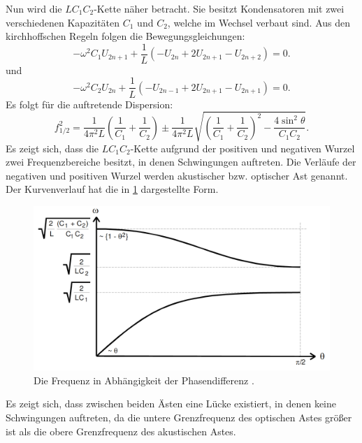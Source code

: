  Nun wird die $LC_1C_2$-Kette näher betracht. Sie besitzt Kondensatoren mit zwei
  verschiedenen Kapazitäten $C_1$ und $C_2$, welche im Wechsel verbaut sind.
 Aus den kirchhoffschen Regeln folgen die Bewegungsgleichungen:
 \begin{equation}
   -\omega^2 C_1 U_{2n+1} + \frac{1}{L} \left( -U_{2n} + 2U_{2n+1} - U_{2n+2} \right) = 0\text{.}
 \end{equation}
 und
 \begin{equation}
   -\omega^2 C_2 U_{2n} + \frac{1}{L} \left( -U_{2n-1} + 2U_{2n+1} - U_{2n+1} \right) = 0\text{.}
 \end{equation}
Es folgt für die auftretende Dispersion:
\begin{equation}
  f_{1/2}^2 = \frac{1}{4\pi^2L}\left(\frac{1}{C_1}+\frac{1}{C_2}\right) \pm \frac{1}{4\pi^2L}\sqrt{\left(\frac{1}{C_1}+\frac{1}{C_2} \right)^2 - \frac{4 \sin^2\theta}{C_1C_2}}\text{.}
\end{equation}
Es zeigt sich, dass die $LC_1C_2$-Kette aufgrund der positiven und negativen Wurzel
zwei Frequenzbereiche besitzt, in denen Schwingungen auftreten. Die Verläufe der
 negativen und positiven Wurzel werden akustischer bzw. optischer Ast genannt.
 Der Kurvenverlauf hat die in \ref{fig:thetaf} dargestellte Form.
 \begin{figure}[H]
   \centering
   \includegraphics[width=\linewidth-70pt,height=\textheight-70pt,keepaspectratio]{content/Grafiken/Dispersionskurven.png}
   \caption{Die Frequenz in Abhängigkeit der Phasendifferenz \cite{V356}.}
   \label{fig:thetaf}
 \end{figure}
 Es zeigt sich, dass zwischen beiden Ästen eine Lücke existiert,
  in denen keine Schwingungen auftreten, da die untere Grenzfrequenz des
   optischen Astes größer ist als die obere Grenzfrequenz des akustischen Astes.
